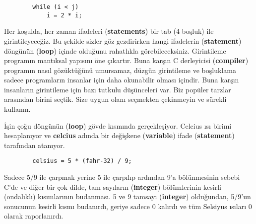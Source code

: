 \documentclass[a4paper,12pt,oneside]{book}
\begin{document}
\begin{lstlisting}
        while (i < j)
            i = 2 * i;
\end{lstlisting}
Her koşulda, her zaman ifadeleri (\textbf{statements}) bir tab (4 boşluk) ile girintileyeceğiz. Bu şekilde sizler göz gezdirirken hangi ifadelerin (\textbf{statement}) döngünün (\textbf{loop}) içinde olduğunu rahatlıkla görebileceksiniz. Girintileme programın mantıksal yapısını öne çıkartır. Buna karşın C derleyicisi (\textbf{compiler}) programın nasıl gözüktüğünü umursamaz, düzgün girintileme ve boşluklama sadece programların insanlar için daha okunabilir olması içindir. Buna karşın insanların girintileme için bazı tutkulu düşünceleri var. Biz popüler tarzlar arasından birini seçtik. Size uygun olanı seçmekten çekinmeyin ve sürekli kullanın. \pagebreak
\par İşin çoğu döngünün (\textbf{loop}) gövde kısmında gerçekleşiyor. Celcius ısı birimi hesaplanıyor ve \textbf{celcius} adında bir değişkene (\textbf{variable}) ifade (\textbf{statement}) tarafından atanıyor.
\begin{lstlisting}
        celsius = 5 * (fahr-32) / 9;
\end{lstlisting}
Sadece 5/9 ile çarpmak yerine 5 ile çarpılıp ardından 9'a bölünmesinin sebebi C'de ve diğer bir çok dilde, tam sayıların (\textbf{integer}) bölümlerinin kesirli (ondalıklı) kısımlarının budanması. 5 ve 9 tamsayı (\textbf{integer}) olduğundan, 5/9'un sonucunun kesirli kısmı budanırdı, geriye sadece 0 kalırdı ve tüm Selsiyus ısıları 0 olarak raporlanırdı.
\end{document}
